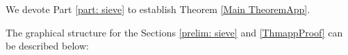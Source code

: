 \documentclass[12pt]{amsart}
\numberwithin{equation}{section}
\theoremstyle{remark}
\theoremstyle{definition}
\begin{document}
We devote Part \ref{part: sieve} to establish Theorem \ref{Main TheoremApp}. %


The graphical structure for the Sections \ref{prelim: sieve} and \ref{ThmappProof} can be described below:
\medskip
\end{document}
